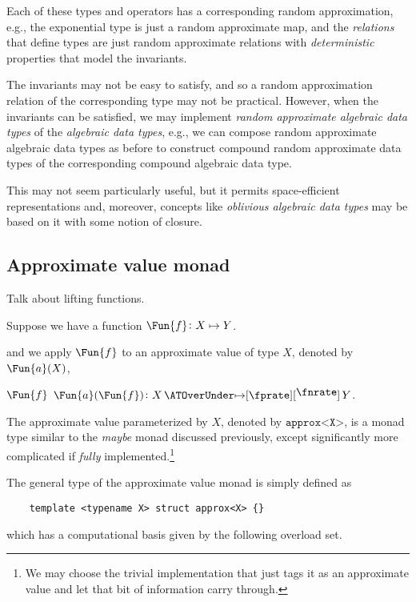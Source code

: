 \documentclass[ ../main.tex]{subfiles}
\begin{document}
Each of these types and operators has a corresponding random approximation, e.g., the exponential type is just a random approximate map, and the \emph{relations} that define types are just random approximate relations with \emph{deterministic} properties that model the invariants.

The invariants may not be easy to satisfy, and so a random approximation relation of the corresponding type may not be practical.
However, when the invariants can be satisfied, we may implement \emph{random approximate algebraic data types} of the \emph{algebraic data types}, e.g., we can compose random approximate algebraic data types as before to construct compound random approximate data types of the corresponding compound algebraic data type.

This may not seem particularly useful, but it permits space-efficient representations and, moreover, concepts like \emph{oblivious algebraic data types} may be based on it with some notion of closure.

\subsection{Approximate value monad}

Talk about lifting functions.




Suppose we have a function $\Fun{f} \colon X \mapsto Y$.



 and we apply $\Fun{f}$ to an approximate value of type $X$, denoted by $\Fun{a}(X)$, 


$\Fun{f}$  $\Fun{a}(\Fun{f}) \colon X \amapsto{\fprate}{\fnrate} Y$.

The approximate value parameterized by $X$, denoted by $\texttt{approx<X>}$, is a monad type similar to the \emph{maybe} monad discussed previously, except significantly more complicated if \emph{fully} implemented.\footnote{We may choose the trivial implementation that just tags it as an approximate value and let that bit of information carry through.}

The general type of the approximate value monad is simply defined as
\begin{verbatim}
	template <typename X> struct approx<X> {}
\end{verbatim}
which has a computational basis given by the following overload set.
\end{document}
